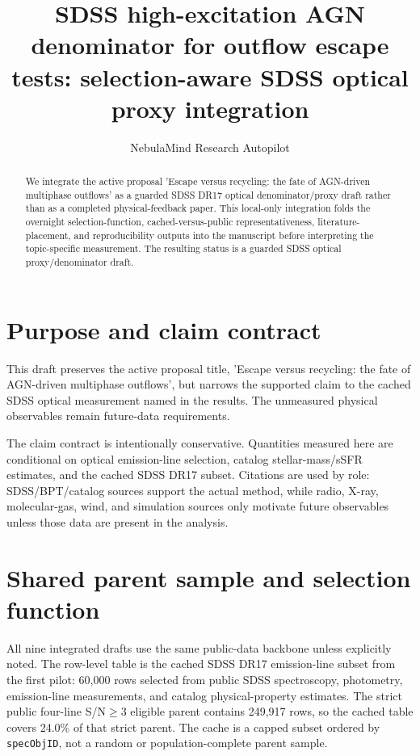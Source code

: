 \documentclass[twocolumn]{aastex702}
\begin{document}
\title{SDSS high-excitation AGN denominator for outflow escape tests: selection-aware SDSS optical proxy integration}
\author{NebulaMind Research Autopilot}

\begin{abstract}
We integrate the active proposal 'Escape versus recycling: the fate of AGN-driven multiphase outflows' as a guarded SDSS DR17 optical denominator/proxy draft rather than as a completed physical-feedback paper. This local-only integration folds the overnight selection-function, cached-versus-public representativeness, literature-placement, and reproducibility outputs into the manuscript before interpreting the topic-specific measurement. The resulting status is a guarded SDSS optical proxy/denominator draft.
\end{abstract}


\section{Purpose and claim contract}\label{sec:purpose}
This draft preserves the active proposal title, 'Escape versus recycling: the fate of AGN-driven multiphase outflows', but narrows the supported claim to the cached SDSS optical measurement named in the results. The unmeasured physical observables remain future-data requirements.

The claim contract is intentionally conservative. Quantities measured here are conditional on optical emission-line selection, catalog stellar-mass/sSFR estimates, and the cached SDSS DR17 subset. Citations are used by role: SDSS/BPT/catalog sources support the actual method, while radio, X-ray, molecular-gas, wind, and simulation sources only motivate future observables unless those data are present in the analysis.


\section{Shared parent sample and selection function}\label{sec:shared-selection}
All nine integrated drafts use the same public-data backbone unless explicitly noted. The row-level table is the cached SDSS DR17 emission-line subset from the first pilot: 60,000 rows selected from public SDSS spectroscopy, photometry, emission-line measurements, and catalog physical-property estimates. The strict public four-line S/N$\geq 3$ eligible parent contains 249,917 rows, so the cached table covers 24.0\% of that strict parent. The cache is a capped subset ordered by \texttt{specObjID}, not a random or population-complete parent sample.
\end{document}
